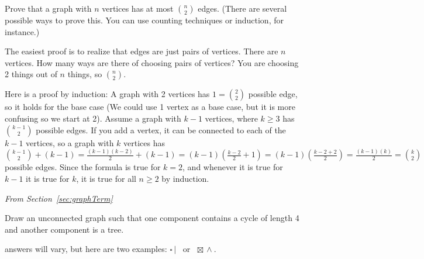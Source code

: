 \begin{requ}
Prove that a graph with $n$ vertices has at most $\binom{n}{2}$ edges.
(There are several possible ways to prove this. You can use counting techniques or induction, for instance.)
\begin{requanswer}
The easiest proof is to realize that edges are just pairs of vertices. There are $n$ vertices. How many ways are there of
choosing pairs of vertices? You are choosing 2 things out of $n$ things, so $\binom{n}{2}$.

Here is a proof by induction: A graph with 2 vertices has $1=\binom{2}{2}$ possible edge, so it holds for the base case
(We could use 1 vertex as a base case, but it is more confusing so we start at 2).
Assume a graph with $k-1$ vertices, where $k\geq 3$ has $\binom{k-1}{2}$ possible edges. 
If you add a vertex, it can be connected to each of
the $k-1$ vertices, so a graph with $k$ vertices has 
$\binom{k-1}{2}+(k-1) = \frac{(k-1)(k-2)}{2}+(k-1) = (k-1)\left(\frac{k-2}{2} + 1\right) 
= (k-1)\left(\frac{k-2+2}{2}\right)
=\frac{(k-1)(k)}{2}=\binom{k}{2}$ possible edges.
Since the formula is true for $k=2$, and whenever it is true for $k-1$ it is true for $k$, it is true for all $n\geq 2$ by induction.
\end{requanswer}
\end{requ}

\noindent
{\em From Section~\ref{sec:graphTerm}}
\begin{requ}
Draw an unconnected graph such that one component contains a cycle of length 4 and another component is a tree.
\begin{requanswer}
answers will vary, but here are two examples:  $\square \, |$ \, or \,  $\boxtimes \, \wedge$.
\end{requanswer}
\end{requ}

